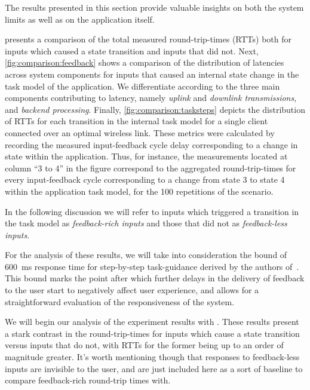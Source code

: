 The results presented in this section provide valuable insights on both the system limits as well as on the application itself.

 presents a comparison of the total measured round-trip-times (RTTs) both for inputs which caused a state transition and inputs that did not.
Next, \cref{fig:comparison:feedback} shows a comparison of the distribution of latencies across system components for inputs that caused an internal state change in the task model of the application.
We differentiate according to the three main components contributing to latency, namely \emph{uplink} and \emph{downlink transmissions}, and \emph{backend processing}.
Finally, \cref{fig:comparison:tasksteps} depicts the distribution of RTTs for each transition in the internal task model for a single client connected over an optimal wireless link.
These metrics were calculated by recording the measured input-feedback cycle delay corresponding to a change in state within the application.
Thus, for instance, the measurements located at column ``3 to 4'' in the figure correspond to the aggregated round-trip-times for every input-feedback cycle corresponding to a change from state 3 to state 4 within the application task model, for the 100 repetitions of the scenario.

In the following discussion we will refer to inputs which triggered a transition in the task model as \emph{feedback-rich inputs} and those that did not as \emph{feedback-less inputs}.

For the analysis of these results, we will take into consideration the bound of \SI{600}{\milli\second} response time for step-by-step task-guidance derived by the authors of~\cite{Chen:AnEmpiricalStudyOfLatency}.
This bound marks the point after which further delays in the delivery of feedback to the user start to negatively affect user experience, and allows for a straightforward evaluation of the responsiveness of the system.

We will begin our analysis of the experiment results with .
These results present a stark contrast in the round-trip-times for inputs which cause a state transition versus inputs that do not, with RTTs for the former being up to an order of magnitude greater.
It's worth mentioning though that responses to feedback-less inputs are invisible to the user, and are just included here as a sort of baseline to compare feedback-rich round-trip times with.

